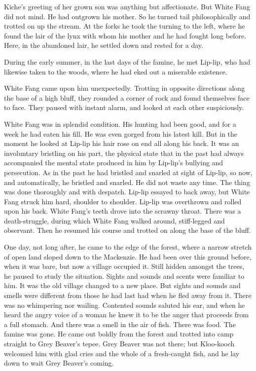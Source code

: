 \documentclass[10pt]{book}
\begin{document}
Kiche’s greeting of her grown son was anything but affectionate. But
White Fang did not mind. He had outgrown his mother. So he turned tail
philosophically and trotted on up the stream. At the forks he took the
turning to the left, where he found the lair of the lynx with whom his
mother and he had fought long before. Here, in the abandoned lair, he
settled down and rested for a day.

During the early summer, in the last days of the famine, he met
Lip-lip, who had likewise taken to the woods, where he had eked out a
miserable existence.

White Fang came upon him unexpectedly. Trotting in opposite directions
along the base of a high bluff, they rounded a corner of rock and found
themselves face to face. They paused with instant alarm, and looked at
each other suspiciously.

White Fang was in splendid condition. His hunting had been good, and
for a week he had eaten his fill. He was even gorged from his latest
kill. But in the moment he looked at Lip-lip his hair rose on end all
along his back. It was an involuntary bristling on his part, the
physical state that in the past had always accompanied the mental state
produced in him by Lip-lip’s bullying and persecution. As in the past
he had bristled and snarled at sight of Lip-lip, so now, and
automatically, he bristled and snarled. He did not waste any time. The
thing was done thoroughly and with despatch. Lip-lip essayed to back
away, but White Fang struck him hard, shoulder to shoulder. Lip-lip was
overthrown and rolled upon his back. White Fang’s teeth drove into the
scrawny throat. There was a death-struggle, during which White Fang
walked around, stiff-legged and observant. Then he resumed his course
and trotted on along the base of the bluff.

One day, not long after, he came to the edge of the forest, where a
narrow stretch of open land sloped down to the Mackenzie. He had been
over this ground before, when it was bare, but now a village occupied
it. Still hidden amongst the trees, he paused to study the situation.
Sights and sounds and scents were familiar to him. It was the old
village changed to a new place. But sights and sounds and smells were
different from those he had last had when he fled away from it. There
was no whimpering nor wailing. Contented sounds saluted his ear, and
when he heard the angry voice of a woman he knew it to be the anger
that proceeds from a full stomach. And there was a smell in the air of
fish. There was food. The famine was gone. He came out boldly from the
forest and trotted into camp straight to Grey Beaver’s tepee. Grey
Beaver was not there; but Kloo-kooch welcomed him with glad cries and
the whole of a fresh-caught fish, and he lay down to wait Grey Beaver’s
coming.
\end{document}
